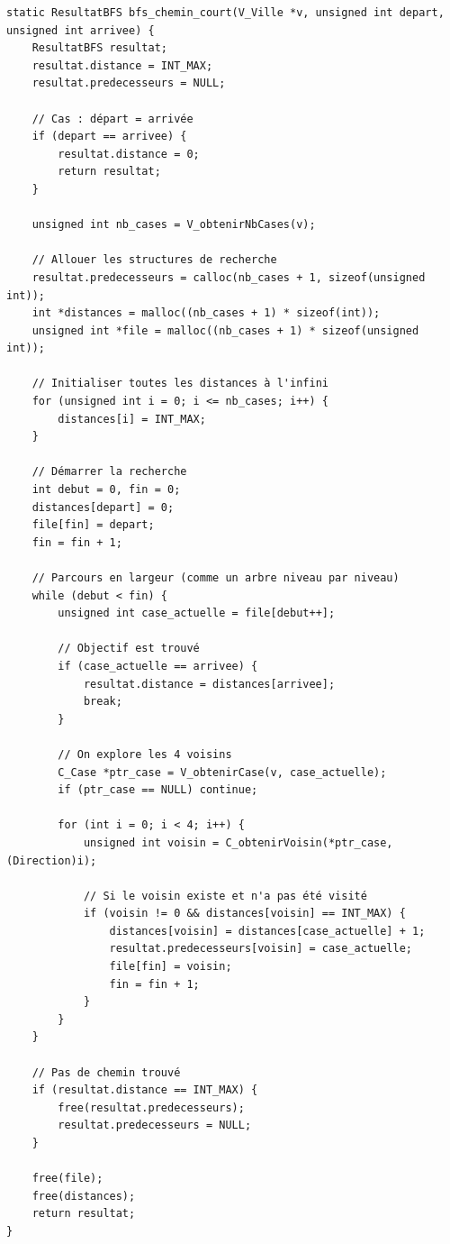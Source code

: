 \begin{lstlisting}[caption={bfs\_chemin\_court}]
static ResultatBFS bfs_chemin_court(V_Ville *v, unsigned int depart, unsigned int arrivee) {
    ResultatBFS resultat;
    resultat.distance = INT_MAX;
    resultat.predecesseurs = NULL;

    // Cas : départ = arrivée
    if (depart == arrivee) {
        resultat.distance = 0;
        return resultat;
    }

    unsigned int nb_cases = V_obtenirNbCases(v);
    
    // Allouer les structures de recherche
    resultat.predecesseurs = calloc(nb_cases + 1, sizeof(unsigned int));
    int *distances = malloc((nb_cases + 1) * sizeof(int));
    unsigned int *file = malloc((nb_cases + 1) * sizeof(unsigned int));
    
    // Initialiser toutes les distances à l'infini
    for (unsigned int i = 0; i <= nb_cases; i++) {
        distances[i] = INT_MAX;
    }
    
    // Démarrer la recherche
    int debut = 0, fin = 0;
    distances[depart] = 0;
    file[fin] = depart;  
    fin = fin + 1;       

    // Parcours en largeur (comme un arbre niveau par niveau)
    while (debut < fin) {
        unsigned int case_actuelle = file[debut++];
        
        // Objectif est trouvé 
        if (case_actuelle == arrivee) {
            resultat.distance = distances[arrivee];
            break;
        }

        // On explore les 4 voisins
        C_Case *ptr_case = V_obtenirCase(v, case_actuelle);
        if (ptr_case == NULL) continue;
        
        for (int i = 0; i < 4; i++) {
            unsigned int voisin = C_obtenirVoisin(*ptr_case, (Direction)i);
            
            // Si le voisin existe et n'a pas été visité
            if (voisin != 0 && distances[voisin] == INT_MAX) {
                distances[voisin] = distances[case_actuelle] + 1;
                resultat.predecesseurs[voisin] = case_actuelle;
                file[fin] = voisin; 
                fin = fin + 1;       
            }
        }
    }

    // Pas de chemin trouvé
    if (resultat.distance == INT_MAX) {
        free(resultat.predecesseurs);
        resultat.predecesseurs = NULL;
    }
    
    free(file);
    free(distances);
    return resultat;
}

\end{lstlisting}
